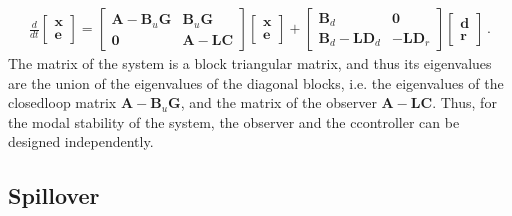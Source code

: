 \documentclass[letterpaper,10pt,english]{jupyterBook}
\begin{document}
\begin{equation*}
\begin{split}
\frac{d}{dt} \begin{bmatrix} \mathbf{x} \\ \mathbf{e} \end{bmatrix} = 
\begin{bmatrix} \mathbf{A} - \mathbf{B}_u \mathbf{G} & \mathbf{B}_u \mathbf{G} \\ \mathbf{0} & \mathbf{A} - \mathbf{L} \mathbf{C} \end{bmatrix} 
\begin{bmatrix} \mathbf{x} \\ \mathbf{e} \end{bmatrix} + 
\begin{bmatrix} \mathbf{B}_d & \mathbf{0} \\ \mathbf{B}_d - \mathbf{L} \mathbf{D}_d & - \mathbf{L} \mathbf{D}_r \end{bmatrix} 
\begin{bmatrix} \mathbf{d} \\ \mathbf{r} \end{bmatrix} \ .
\end{split}
\end{equation*}
\sphinxAtStartPar
The matrix of the system is a block triangular matrix, and thus its eigenvalues are the union of the eigenvalues of the diagonal blocks, i.e. the eigenvalues of the closed\sphinxhyphen{}loop matrix \(\mathbf{A} - \mathbf{B}_u \mathbf{G}\), and the matrix of the observer \(\mathbf{A} - \mathbf{L} \mathbf{C}\). Thus, for the modal stability of the system, the observer and the ccontroller can be designed independently.


\subsection{Spillover}
\label{\detokenize{ch/control/optimal-control-regulator-observer:spillover}}\label{\detokenize{ch/control/optimal-control-regulator-observer:control-controller-observer-spillover}}
\end{document}
